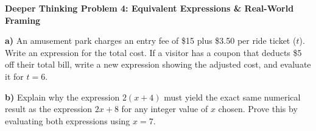 \documentclass[12pt, letterpaper, fleqn]{article}
\begin{document}
\begin{tcolorbox}[colback=white, colframe=black, boxrule=1pt, arc=4mm, left=6mm, right=6mm, top=5mm, bottom=5mm]
\textbf{Deeper Thinking Problem 4: Equivalent Expressions \& Real-World Framing}

\medskip

\noindent
\textbf{a)} An amusement park charges an entry fee of \$15 plus \$3.50 per ride ticket ($t$). Write an expression for the total cost. If a visitor has a coupon that deducts \$5 off their total bill, write a new expression showing the adjusted cost, and evaluate it for $t = 6$.

\vspace{2.5cm}

\noindent
\textbf{b)} Explain why the expression $2(x + 4)$ must yield the exact same numerical result as the expression $2x + 8$ for any integer value of $x$ chosen. Prove this by evaluating both expressions using $x = 7$.

\vspace{2.5cm}
\end{tcolorbox}
\end{document}
